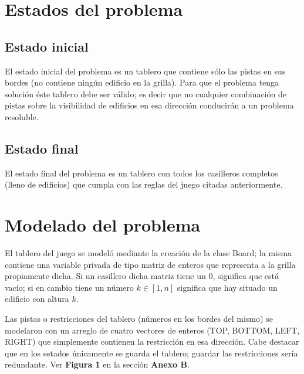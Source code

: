 \documentclass[%
	final,
	reprint,
	notitlepage,
	narroweqnarray,
	inline,
	twoside,
	invited
	]{ieee}
\begin{document}


\section{Estados del problema}

\subsection{Estado inicial}

\par El estado inicial del problema es un tablero que contiene sólo las pistas en sus bordes (no contiene ningún edificio en la grilla). Para que el problema tenga solución éste tablero debe ser válido; es decir que no cualquier combinación de pistas sobre la visibilidad de edificios en esa dirección conducirán a un problema resoluble.

\subsection{Estado final}

\par El estado final del problema es un tablero con todos los casilleros completos (lleno de edificios) que cumpla con las reglas del juego citadas anteriormente.

\section{Modelado del problema}

\par El tablero del juego se modeló mediante la creación de la clase Board; la misma contiene una variable privada de tipo matriz de enteros que representa a la grilla propiamente dicha. Si un casillero dicha matriz  tiene un $0$, significa que  está vacío; si en cambio tiene un número $k \in [1,n]$ significa que hay situado un edificio con altura $k$.\\
\par Las pistas o restricciones del tablero (números en los bordes del mismo) se modelaron con un arreglo de cuatro vectores de enteros (TOP, BOTTOM, LEFT, RIGHT) que simplemente contienen la restricción en esa dirección.
Cabe destacar que en los estados únicamente se guarda el tablero; guardar las restricciones sería redundante. Ver \textbf{Figura 1} en la sección \textbf{Anexo B}.\\
\end{document}

